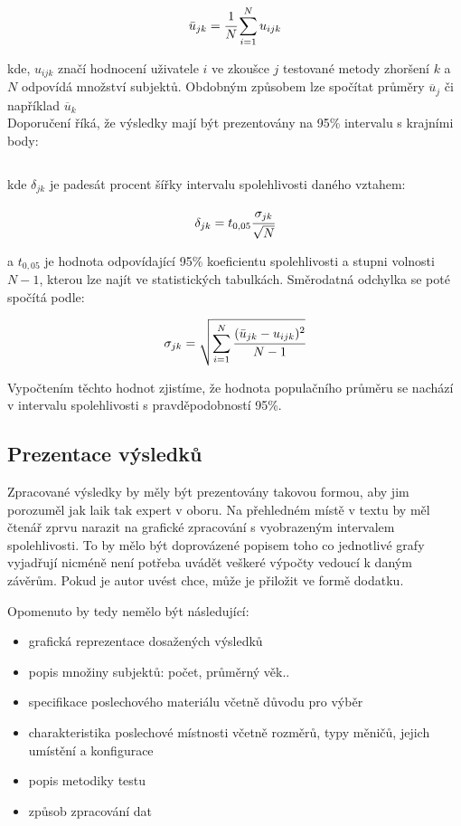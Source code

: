\begin{equation}
    \bar{u}_{jk}=\cfrac{1}{N}\sum_{i=1}^{N}u_{ijk}
\end{equation}

\noindent kde, $u_{ijk}$ značí hodnocení uživatele $i$ ve zkoušce $j$ testované metody zhoršení $k$ a $N$ odpovídá množství subjektů. Obdobným způsobem lze spočítat průměry $\overline{u}_j$ či například $\overline{u}_k$ \\

Doporučení \cite{itur:1534} říká, že výsledky mají být prezentovány na 95\% intervalu s krajními body:

\begin{equation}
    [\bar{u}_{jk} - \delta_{jk},\bar{u}_{jk} + \delta_{jk}]
\end{equation}

\noindent kde $\delta_{jk}$ je padesát procent šířky intervalu spolehlivosti daného vztahem: 

\begin{equation}
    \delta_{jk} = t_{0,05}\cfrac{\sigma_{jk}}{\sqrt{N}}
    \label{equation:inteval}
\end{equation}

\noindent a $t_{0,05}$ je hodnota odpovídající 95\% koeficientu spolehlivosti a stupni volnosti $N-1$, kterou lze najít ve statistických tabulkách. Směrodatná odchylka se poté spočítá podle:

\begin{equation}
    \sigma_{jk} =\sqrt{\sum_{i=1}^{N}\cfrac{(\bar{u}_{jk}-u_{ijk})^2}{N-1}}
\end{equation}
 
Vypočtením těchto hodnot zjistíme, že hodnota populačního průměru se nachází v intervalu spolehlivosti s pravděpodobností 95\%.



\subsection{Prezentace výsledků}

Zpracované výsledky by měly být prezentovány takovou formou, aby jim porozuměl jak laik tak expert v oboru. Na přehledném místě v textu by měl čtenář zprvu narazit na grafické zpracování s vyobrazeným intervalem spolehlivosti. To by mělo být doprovázené popisem toho co jednotlivé grafy vyjadřují nicméně není potřeba uvádět veškeré výpočty vedoucí k daným závěrům. Pokud je autor uvést chce, může je přiložit ve formě dodatku.
\smallskip

Opomenuto by tedy nemělo být následující: \begin{itemize}
    \item grafická reprezentace dosažených výsledků
    \item popis množiny subjektů: počet, průměrný věk..
    \item specifikace poslechového materiálu včetně důvodu pro výběr
    \item charakteristika poslechové místnosti včetně rozměrů, typy měničů, jejich umístění a konfigurace 
    \item popis metodiky testu
    \item způsob zpracování dat
    \
\end{itemize}